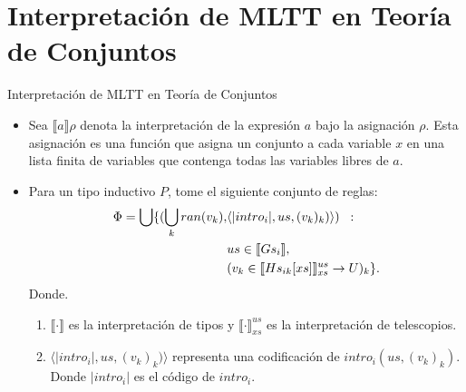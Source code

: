 \documentclass[dvipsnames, 8pt]{beamer} %
\theoremstyle{plain}
\theoremstyle{definition}
\begin{document}
\section{Interpretación de MLTT en Teoría de Conjuntos}

\begin{frame}{Interpretación de MLTT en Teoría de Conjuntos}
    \begin{itemize}
        \item Sea $\llbracket a \rrbracket\rho$ denota la interpretación de la expresión $a$ bajo la asignación $\rho$. Esta asignación es una función que asigna un conjunto a cada variable $x$ en una lista finita de variables que contenga todas las variables libres de $a$.\pause
        \item Para un tipo inductivo $P$, tome el siguiente conjunto de reglas:\pause    
        \begin{align*}
            \Phi = \bigcup \{(\bigcup_{k} ran(v_{k}), &\langle |intro_{i}|, us, (v_{k})_{k})\rangle)\hspace{2mm}:\\
            & us\in\llbracket Gs_{i}\rrbracket,\\
            & (v_k\in \llbracket Hs_{ik}[xs]\rrbracket_{xs}^{us}\to U)_{k} \}.
        \end{align*}\pause
        Donde. \pause
        \begin{enumerate}
            \item $\llbracket\cdot\rrbracket$ es la interpretación de tipos y $\llbracket\cdot\rrbracket_{xs}^{us}$ es la interpretación de telescopios.\pause
            \item $ \langle |intro_{i}|, us, (v_{k})_{k})\rangle$ representa una codificación de $intro_{i}(us,(v_{k})_{k})$. Donde $|intro_{i}|$ es el código de $intro_{i}$.
        \end{enumerate}
    \end{itemize}
\end{frame}
\end{document}
